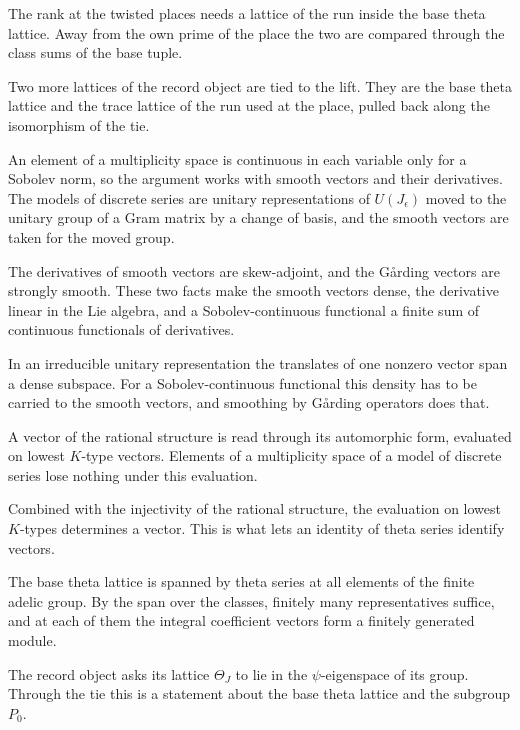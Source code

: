 The rank at the twisted places needs a lattice of the run inside the base theta lattice. Away from
the own prime of the place the two are compared through the class sums of the base tuple.

Two more lattices of the record object are tied to the lift. They are the base theta lattice and the
trace lattice of the run used at the place, pulled back along the isomorphism of the tie.

An element of a multiplicity space is continuous in each variable only for a Sobolev norm, so the
argument works with smooth vectors and their derivatives. The models of discrete series are unitary
representations of $U(J_\epsilon)$ moved to the unitary group of a Gram matrix by a change of basis, and
the smooth vectors are taken for the moved group.

The derivatives of smooth vectors are skew-adjoint, and the Gårding vectors are strongly smooth.
These two facts make the smooth vectors dense, the derivative linear in the Lie algebra, and a
Sobolev-continuous functional a finite sum of continuous functionals of derivatives.

In an irreducible unitary representation the translates of one nonzero vector span a dense subspace.
For a Sobolev-continuous functional this density has to be carried to the smooth vectors, and smoothing
by Gårding operators does that.

A vector of the rational structure is read through its automorphic form, evaluated on lowest $K$-type
vectors. Elements of a multiplicity space of a model of discrete series lose nothing under this
evaluation.

Combined with the injectivity of the rational structure, the evaluation on lowest $K$-types determines
a vector. This is what lets an identity of theta series identify vectors.

The base theta lattice is spanned by theta series at all elements of the finite adelic group. By the span
over the classes, finitely many representatives suffice, and at each of them the integral coefficient
vectors form a finitely generated module.

The record object asks its lattice $\Theta_J$ to lie in the $\psi$-eigenspace of its group. Through the
tie this is a statement about the base theta lattice and the subgroup $P_0$.

